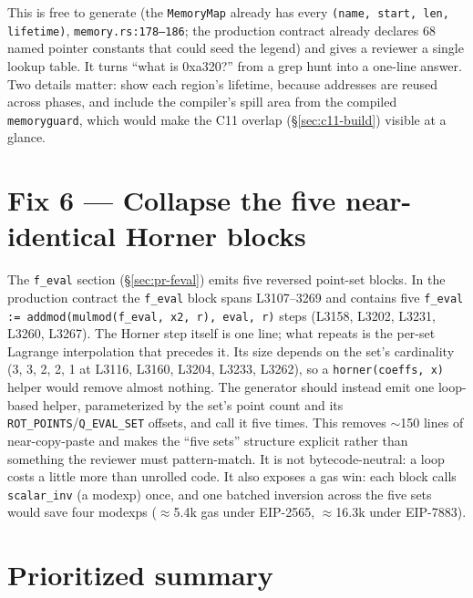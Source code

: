 This is free to generate (the \texttt{MemoryMap} already has every
\texttt{(name, start, len, lifetime)}, \texttt{memory.rs:178--186}; the
production contract already declares 68 named pointer constants that could
seed the legend) and gives a reviewer a single lookup table. It turns
``what is 0xa320?'' from a grep hunt into a one-line answer. Two details
matter: show each region's lifetime, because addresses are reused across
phases, and include the compiler's spill area from the compiled
\texttt{memoryguard}, which would make the C11 overlap
(\S\ref{sec:c11-build}) visible at a glance.

\section{Fix 6 --- Collapse the five near-identical Horner blocks}
\label{sec:read-horner}

The \texttt{f\_eval} section (\S\ref{sec:pr-feval}) emits five
reversed point-set blocks. In the production contract the
\texttt{f\_eval} block spans L3107--3269 and contains five
\texttt{f\_\allowbreak{}eval := addmod(mulmod(f\_\allowbreak{}eval, x2, r), eval, r)} steps
(L3158, L3202, L3231, L3260, L3267). The Horner step itself is one line;
what repeats is the per-set Lagrange interpolation that precedes it. Its
size depends on the set's cardinality (3, 3, 2, 2, 1 at L3116, L3160, L3204,
L3233, L3262), so a \texttt{horner(coeffs, x)} helper would remove almost
nothing. The generator should instead emit one loop-based helper,
parameterized by the set's point count and its \texttt{ROT\_POINTS}/\texttt{Q\_EVAL\_SET}
offsets, and call it five times. This removes $\sim$150 lines of
near-copy-paste and makes the ``five sets'' structure explicit rather than
something the reviewer must pattern-match. It is not bytecode-neutral: a
loop costs a little more than unrolled code. It also exposes a gas win:
each block calls \texttt{scalar\_inv} (a modexp) once, and one batched
inversion across the five sets would save four modexps ($\approx$5.4k gas under
EIP-2565, $\approx$16.3k under EIP-7883).

\section{Prioritized summary}
\label{sec:read-priority}

